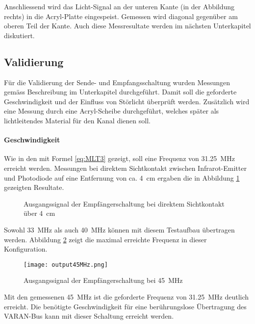 Anschliessend wird das Licht-Signal an der unteren Kante (in der Abbildung rechts) in die Acryl-Platte eingespeist. Gemessen wird diagonal gegenüber am oberen Teil der Kante. Auch diese Messresultate werden im nächsten Unterkapitel diskutiert.

\subsection{Validierung} 

Für die Validierung der Sende- und Empfangsschaltung wurden Messungen gemäss Beschreibung im Unterkapitel  durchgeführt. Damit soll die geforderte Geschwindigkeit und der Einfluss von Störlicht überprüft werden. Zusätzlich wird eine Messung durch eine Acryl-Scheibe durchgeführt, welches später als lichtleitendes Material für den Kanal dienen soll.
 
\paragraph{Geschwindigkeit}
Wie in den  mit Formel \ref{eq:MLT3} gezeigt, soll eine Frequenz von \SI{31.25}{MHz} erreicht werden. Messungen bei direktem Sichtkontakt zwischen Infrarot-Emitter und Photodiode auf eine Entfernung von ca. \SI{4}{cm} ergaben die in Abbildung \ref{fig:output33_40} gezeigten Resultate.

\begin{figure}[h!]
	\centering
	\qquad
	\caption{Ausgangssignal der Empfängerschaltung bei direktem Sichtkontakt über \SI{4}{cm}}
	\label{fig:output33_40}
\end{figure}

Sowohl \SI{33}{MHz} als auch \SI{40}{MHz} können mit diesem Testaufbau übertragen werden. Abbildung \ref{fig:output45} zeigt die maximal erreichte Frequenz in dieser Konfiguration.


\begin{figure}[h!]
	\centering
	\texttt{[image: output45MHz.png]}
	\caption{Ausgangssignal der Empfängerschaltung bei \SI{45}{MHz}}
	\label{fig:output45}
\end{figure}

Mit den gemessenen \SI{45}{MHz} ist die geforderte Frequenz von \SI{31.25}{MHz} deutlich erreicht. Die benötigte Geschwindigkeit für eine berührungslose Übertragung des VARAN-Bus kann mit dieser Schaltung erreicht werden.

